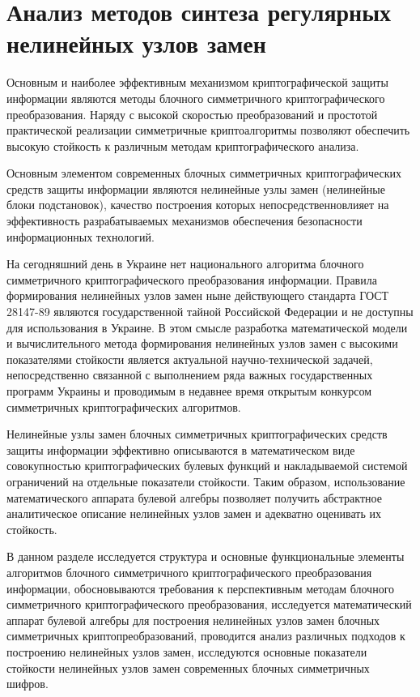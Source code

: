 \chapter{Анализ методов синтеза регулярных нелинейных узлов замен}

Основным и наиболее  эффективным механизмом криптографической защиты информации
являются методы блочного симметричного криптографического преобразования.
Наряду с высокой скоростью преобразований и простотой практической реализации
симметричные криптоалгоритмы позволяют обеспечить высокую стойкость к различным
методам криптографического анализа.

Основным элементом современных блочных симметричных криптографических средств
защиты информации являются нелинейные узлы замен (нелинейные блоки подстановок),
качество построения которых непосредственновлияет на эффективность
разрабатываемых механизмов обеспечения безопасности информационных технологий.

На сегодняшний день в Украине нет национального алгоритма блочного симметричного
криптографического преобразования информации. Правила формирования нелинейных
узлов замен ныне действующего стандарта ГОСТ 28147-89 являются государственной
тайной Российской Федерации и не доступны для использования в Украине. В этом
смысле разработка математической модели и вычислительного метода формирования
нелинейных узлов замен с  высокими показателями стойкости является актуальной
научно-технической задачей, непосредственно связанной с выполнением ряда важных
государственных программ Украины и проводимым в недавнее время открытым
конкурсом симметричных криптографических алгоритмов.

Нелинейные узлы замен блочных  симметричных криптографических средств защиты
информации эффективно описываются в математическом виде совокупностью
криптографических булевых функций и накладываемой системой ограничений на
отдельные показатели стойкости. Таким образом, использование математического
аппарата булевой алгебры позволяет получить абстрактное аналитическое описание
нелинейных узлов замен и адекватно оценивать их стойкость.

В данном разделе исследуется структура и основные функциональные элементы
алгоритмов блочного симметричного криптографического преобразования информации,
обосновываются требования к перспективным методам блочного симметричного
криптографического преобразования, исследуется математический аппарат булевой
алгебры для построения нелинейных узлов замен  блочных симметричных
криптопреобразований, проводится анализ различных подходов к построению
нелинейных узлов замен, исследуются основные показатели стойкости нелинейных
узлов замен современных блочных симметричных шифров.

